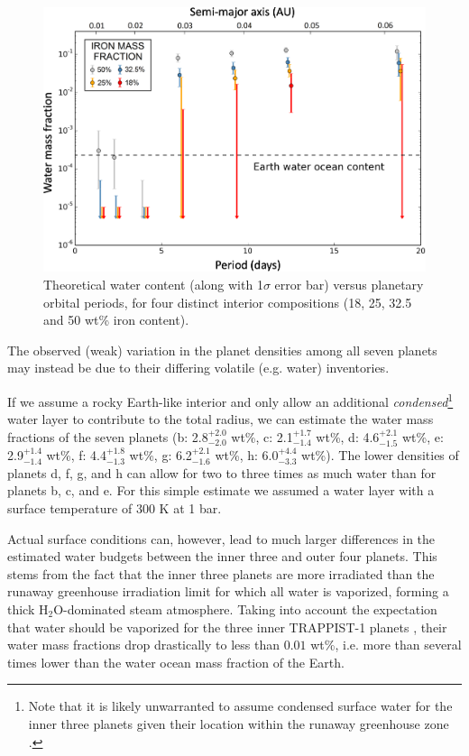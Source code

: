 \documentclass[twocolumn]{aastex63}
\begin{document}
\begin{figure}
    \centering
    \includegraphics[width=\hsize]{figures/figure_water_period_TTV_trim.png}
    \caption{Theoretical water content (along with 1$\sigma$ error bar) versus planetary orbital periods, for four distinct interior compositions (18, 25, 32.5 and 50 wt\% iron content).}
    \label{fig:water_vs_period}
\end{figure}

The observed (weak) variation in the planet densities among all seven planets may instead be due to their differing volatile (e.g. water) inventories. 

If we assume a rocky Earth-like interior and only allow an additional {\it condensed}\footnote{Note that it is likely unwarranted to assume condensed surface water for the inner three planets given their location within the runaway greenhouse zone \citep{Turbet2020}.} water layer to contribute to the total radius, we can estimate the water mass fractions of the seven planets 
(b: 2.8$^{+2.0}_{-2.0}$ wt\%, c: 2.1$^{+1.7}_{-1.4}$ wt\%, d: 4.6$^{+2.1}_{-1.5}$ wt\%, e: 2.9$^{+1.4}_{-1.4}$ wt\%, f: 4.4$^{+1.8}_{-1.3}$ wt\%, g: 6.2$^{+2.1}_{-1.6}$  wt\%, h: 6.0$^{+4.4}_{-3.3}$ wt\%). 
The lower densities of planets d, f, g, and h can allow for two to three times as much water than for planets b, c, and e. For this simple estimate we assumed a water layer with a surface temperature of 300 K at 1 bar. 

Actual surface conditions can, however, lead to much larger differences in the estimated water budgets between the inner three and outer four planets. This stems from the fact that the inner three planets are more irradiated than the runaway greenhouse irradiation limit \citep{Kopparapu2013,Wolf2017,Turbet2018} for which all water is vaporized, forming a thick H$_2$O-dominated steam atmosphere. Taking into account the expectation that water should be vaporized for the three inner TRAPPIST-1 planets \citep{Turbet2019,Turbet2020}, their water mass fractions drop drastically to less than $0.01$ wt\%, i.e. more than several times lower than the water ocean mass fraction of the Earth. 
\end{document}
